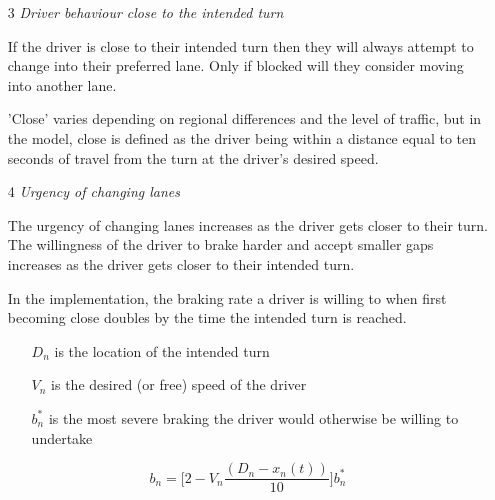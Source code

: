 \begin{enumerate}
\item[3] \textit{Driver behaviour close to the intended turn}

If the driver is close to their intended turn then they will always attempt to change into their preferred lane. Only if blocked will they consider moving into another lane. 

'Close' varies depending on regional differences and the level of traffic, but in the model, close is defined as the driver being within a distance equal to ten seconds of travel from the turn at the driver's desired speed.

\item[4] \textit{Urgency of changing lanes}

The urgency of changing lanes increases as the driver gets closer to their turn. The willingness of the driver to brake harder and accept smaller gaps increases as the driver gets closer to their intended turn.

In the implementation, the braking rate a driver is willing to when first becoming close doubles by the time the intended turn is reached. 

\begin{itemize}
\item[$D_n$] is the location of the intended turn
\item[$V_n$] is the desired (or free) speed of the driver
\item[$b_n^*$] is the most severe braking the driver would otherwise be willing to undertake
\end{itemize}

\begin{equation}
b_n = \Biggl[2 - V_n\frac{(D_n - x_n(t))}{10}\Biggr]b_n^*
\end{equation}

\end{enumerate}



